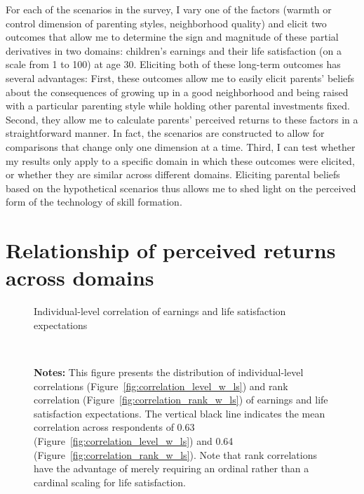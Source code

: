 \documentclass[12pt, a4paper, english]{article}
\begin{document}
For each of the scenarios in the survey, I vary one of the factors (warmth or control dimension of parenting styles, neighborhood quality) and elicit two outcomes that allow me to determine the sign and magnitude of these partial derivatives in two domains: children's earnings and their life satisfaction (on a scale from 1 to 100) at age 30. Eliciting both of these long-term outcomes has several advantages: First, these outcomes allow me to easily elicit parents' beliefs about the consequences of growing up in a good neighborhood and being raised with a particular parenting style while holding other parental investments fixed. Second, they allow me to calculate parents' perceived returns to these factors in a straightforward manner. In fact, the scenarios are constructed to allow for comparisons that change only one dimension at a time. Third, I can test whether my results only apply to a specific domain in which these outcomes were elicited, or whether they are similar across different domains. Eliciting parental beliefs based on the hypothetical scenarios thus allows me to shed light on the perceived form of the technology of skill formation.


\clearpage
\section{Relationship of perceived returns across domains}\label{app:ls_estimates}
\setcounter{table}{0}
\setcounter{figure}{0}
\setcounter{footnote}{0}

\begin{figure}[h!]\centering 
    \caption{Individual-level correlation of earnings and life satisfaction expectations}\label{fig:correlation_w_ls}
    \vspace{-.1cm}
    \\\vspace{-.3cm}
    \caption*{\footnotesize \textbf{Notes:} This figure presents the distribution of individual-level correlations (Figure~\ref{fig:correlation_level_w_ls}) and rank correlation (Figure~\ref{fig:correlation_rank_w_ls}) of earnings and life satisfaction expectations. The vertical black line indicates the mean correlation across respondents of 0.63 (Figure~\ref{fig:correlation_level_w_ls}) and 0.64 (Figure~\ref{fig:correlation_rank_w_ls}). Note that rank correlations have the advantage of merely requiring an ordinal rather than a cardinal scaling for life satisfaction.}
  \end{figure}
\end{document}
